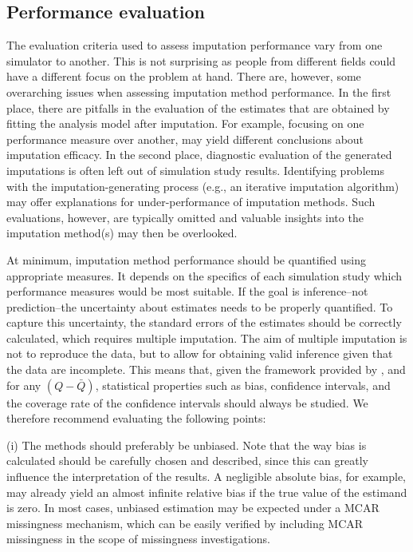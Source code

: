 \documentclass[bimj,fleqn]{w-art}
\begin{document}
\subsection{Performance evaluation}
The evaluation criteria used to assess imputation performance vary from one simulator to another. This is not surprising as people from different fields could have a different focus on the problem at hand. There are, however, some overarching issues when assessing imputation method performance. In the first place, there are pitfalls in the evaluation of the estimates that are obtained by fitting the analysis model after imputation. For example, focusing on one performance measure over another, may yield different conclusions about imputation efficacy. In the second place, diagnostic evaluation of the generated imputations is often left out of simulation study results. Identifying problems with the imputation-generating process (e.g., an iterative imputation algorithm) may offer explanations for under-performance of imputation methods. Such evaluations, however, are typically omitted and valuable insights into the imputation method(s) may then be overlooked. 

At minimum, imputation method performance should be quantified using appropriate measures. It depends on the specifics of each simulation study which performance measures would be most suitable. If the goal is inference--not prediction--the uncertainty about estimates needs to be properly quantified. To capture this uncertainty, the standard errors of the estimates should be correctly calculated, which requires multiple imputation. The aim of multiple imputation is not to reproduce the data, but to allow for obtaining valid inference given that the data are incomplete. This means that, given the framework provided by \citet{rubi87}, and for any $(Q-\bar{Q})$, statistical properties such as bias, confidence intervals, and the coverage rate of the confidence intervals should always be studied. We therefore recommend evaluating the following points:

(i) The methods should preferably be unbiased. Note that the way bias is calculated should be carefully chosen and described, since this can greatly influence the interpretation of the results. A negligible absolute bias, for example, may already yield an almost infinite relative bias if the true value of the estimand is zero. In most cases, unbiased estimation may be expected under a MCAR missingness mechanism, which can be easily verified by including MCAR missingness in the scope of missingness investigations.
\end{document}
